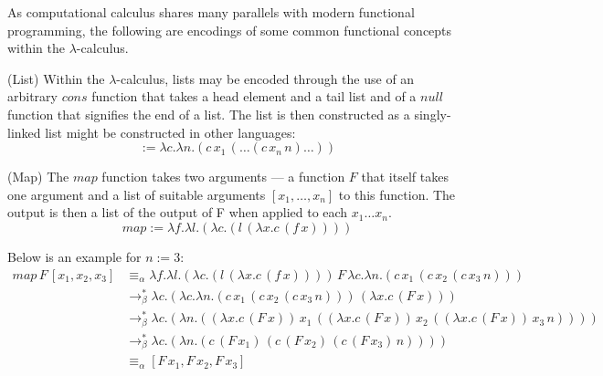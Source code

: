 \documentclass{article}
\begin{document}
        As computational calculus shares many parallels with modern functional programming, the following are encodings of some common functional concepts within the $\lambda$-calculus.

        \begin{definition}{(List)}
            Within the $\lambda$-calculus, lists may be encoded through the use of an arbitrary ${cons}$ function that takes a head element and a tail list and of a ${null}$ function that signifies the end of a list.
            The list is then constructed as a singly-linked list might be constructed in other languages:
            \begin{equation}
                [x_1, \ldots, x_n] := \lambda c . \lambda n . (c \, x_1 \, (\ldots (c \, x_n \, n) \ldots) )
            \end{equation}
        \end{definition}

        \begin{definition}{(Map)}
            The $map$ function takes two arguments --- a function $F$ that itself takes one argument and a list of suitable arguments $[x_1, \ldots, x_n]$ to this function.
            The output is then a list of the output of F when applied to each $x_1 \ldots x_n$.
            \begin{equation}
                {map} := \lambda f . \lambda l . (\lambda c . (l \, (\lambda x . c \, (f \, x))))
            \end{equation}
        \end{definition}

            Below is an example for $n := 3$:
            \begin{align*}
                {map} \, F \, [x_1, x_2, x_3]
                      & \equiv_{\alpha} \lambda f . \lambda l . (\lambda c . (l \, (\lambda x . c \, (f \, x)))) \, F \, \lambda c . \lambda n . (c \, x_1 \, (c \, x_2 \, (c \, x_3 \, n))) \\
                      & \rightarrow_\beta^* \lambda c . (\lambda c . \lambda n . (c \, x_1 \, (c \, x_2 \, (c \, x_3 \, n))) \, (\lambda x . c \, (F \, x))) \\
                      & \rightarrow_\beta^* \lambda c . (\lambda n . ((\lambda x . c \, (F \, x)) \, x_1 \, ((\lambda x . c \, (F \, x)) \, x_2 \, ((\lambda x . c \, (F \, x)) \, x_3 \, n)))) \\
                      & \rightarrow_\beta^* \lambda c . (\lambda n . (c \, (F \, x_1) \, (c \, (F \, x_2) \, (c \, (F \, x_3) \, n)))) \\
                      & \equiv_{\alpha} [F \, x_1, F \, x_2, F \, x_3]
            \end{align*}
\end{document}
